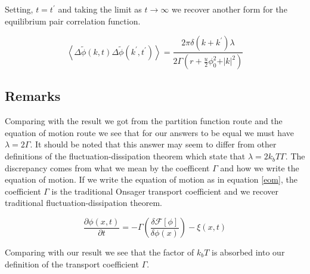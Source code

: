 \documentclass[11pt]{article}
\newcommand{\F}{\mathcal{F}}
\newcommand{\f}{\frac}
\newcommand{\fphi}{\tilde{\phi}}
\begin{document}
Setting, $t = t^\prime$ and taking the limit as $t\rightarrow\infty$ we recover another form for the equilibrium pair correlation function. 

\begin{equation}
	\left\langle \Delta\fphi(k, t) \Delta\fphi(k^\prime, t^\prime)\right\rangle = \f{2\pi\delta(k+k^\prime)\lambda}{2\Gamma(r + \f{u}{2}\phi_0^2 + \vert k\vert^2)}
\end{equation}

\subsection{Remarks}

Comparing with the result we got from the partition function route and the equation of motion route we see that for our answers to be equal we must have $\lambda = 2\Gamma$. It should be noted that this answer may seem to differ from other definitions of the fluctuation-dissipation theorem which state that $\lambda = 2k_bT\Gamma$. The discrepancy comes from what we mean by the coefficent $\Gamma$ and how we write the equation of motion. If we write the equation of motion as in equation \ref{eom}, the coefficient $\Gamma$ is the traditional Onsager transport coefficient and we recover traditional fluctuation-dissipation theorem. 

\begin{equation}\label{eom}
	\f{\partial \phi(x,t)}{\partial t} = -\Gamma \left(\f{\delta \F[\phi]}{\delta \phi(x)}\right) - \xi(x,t)
\end{equation}   

Comparing with our result we see that the factor of $k_bT$ is absorbed into our definition of the transport coefficient $\Gamma$.
\end{document}
